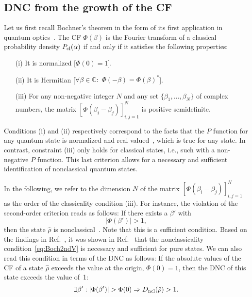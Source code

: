 \documentclass[aps,pra,twocolumn,showpacs,superscriptaddress,10pt]{revtex4-1}
\begin{document}
\subsection{DNC from the growth of the CF}
	Let us first recall Bochner's theorem in the form of its first application in quantum optics~\cite{Vogel2000,Richter2002}.
	The CF $\Phi(\beta)$ is the Fourier transform of a classical probability density $P_{\rm cl}(\alpha)$ if and only if it satisfies the following properties:
	\begin{itemize}
		\item[(i)] It is normalized [$\Phi(0)=1$].
		\item[(ii)] It is Hermitian [$\forall\beta\in\mathbb{C}{:}$ $\Phi(-\beta)=\Phi(\beta)^{\ast}$].
		\item[(iii)] For any non-negative integer $N$ and any set $\{\beta_{1},\dots,\beta_{N}\}$ of complex numbers, the matrix $[\Phi(\beta_{i}-\beta_{j})]_{i,j=1}^{N}$ is positive semidefinite.
	\end{itemize}
	Conditions (i) and (ii) respectively correspond to the facts that the $P$ function for any quantum state is normalized and real valued~\cite{Richter2002,Vogel2000}, which is true for any state.
	In contrast, constraint (iii) only holds for classical states, i.e., such with a non-negative $P$ function.
	This last criterion allows for a necessary and sufficient identification of nonclassical quantum states.

	In the following, we refer to the dimension $N$ of the matrix $[\Phi(\beta_{i}-\beta_{j})]_{i,j=1}^{N}$ as the order of the classicality condition (iii).
	For instance, the violation of the second-order criterion reads as follows:
	If there exists a $\beta'$ with
	\begin{equation}
		|\Phi(\beta')|>1, \label{eq:Boch2ndV}
	\end{equation}
	then the state $\hat\rho$ is nonclassical~\cite{Vogel2000}.
	Note that this  is a sufficient condition.
	Based on the findings in Ref.~\cite{Hillery1985}, it was shown in Ref.~\cite{KieselThesis} that the nonclassicality condition~\eqref{eq:Boch2ndV} is necessary and sufficient for pure states.
	We can also read this condition in terms of the DNC as follows:
	If the absolute values of the CF of a state $\hat{\rho}$ exceeds the value at the origin, $\Phi(0)=1$, then the DNC of this state exceeds the value of~1:
	\begin{equation}
		\exists\beta':|\Phi(\beta')|>\Phi(0)\Rightarrow D_{\rm ncl}(\hat{\rho})>1. \label{eq:Bochner2nd}
	\end{equation}
\end{document}
